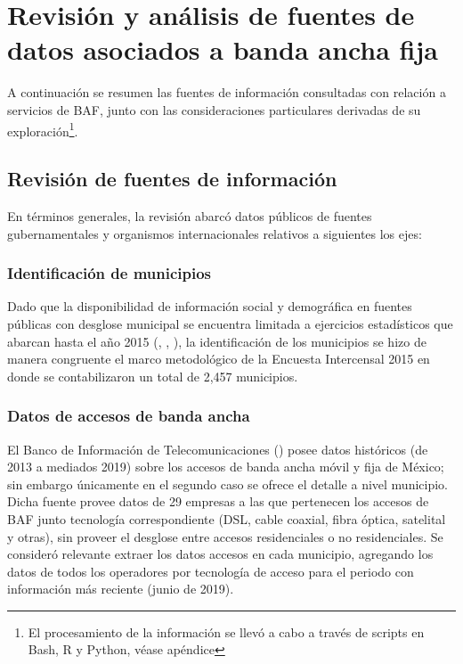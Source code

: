 \documentclass[9pt,twocolumn,twoside]{ilcss}
\begin{document}
\section{Revisión y análisis de fuentes de datos asociados a banda ancha fija}

A continuación se resumen las fuentes de información consultadas con relación a servicios de BAF, junto con las consideraciones particulares derivadas de su exploración\footnote{El procesamiento de la información se llevó a cabo a través de scripts en Bash, R y Python, véase apéndice}. 

\subsection{Revisión de fuentes de información}

En términos generales, la revisión abarcó datos públicos 
de fuentes gubernamentales y organismos internacionales relativos a siguientes los ejes:

\subsubsection{Identificación de municipios}

Dado que la disponibilidad de información social y demográfica en fuentes públicas con desglose municipal se encuentra limitada a ejercicios estadísticos que abarcan hasta el año 2015 (\cite{Intercensal2015}, \cite{CONAPO2015}, \cite{ONU2015}), la identificación de los municipios se hizo de manera congruente el marco metodológico de la Encuesta Intercensal 2015 en donde se contabilizaron un total de 2,457 municipios.

\subsubsection{Datos de accesos de banda ancha}

El Banco de Información de Telecomunicaciones (\cite{IFT2019BIT}) posee datos históricos (de 2013 a mediados 2019) sobre los accesos de banda ancha móvil y fija de México; sin embargo únicamente en el segundo caso se ofrece el detalle a nivel municipio. Dicha fuente provee datos de 29 empresas a las que pertenecen los accesos de BAF junto tecnología correspondiente (DSL, cable coaxial, fibra óptica, satelital y otras), sin proveer el desglose entre accesos residenciales o no residenciales. Se consideró relevante extraer los datos accesos en cada municipio, agregando los datos de todos los operadores por tecnología de acceso para el periodo con información más reciente (junio de 2019).
\end{document}
